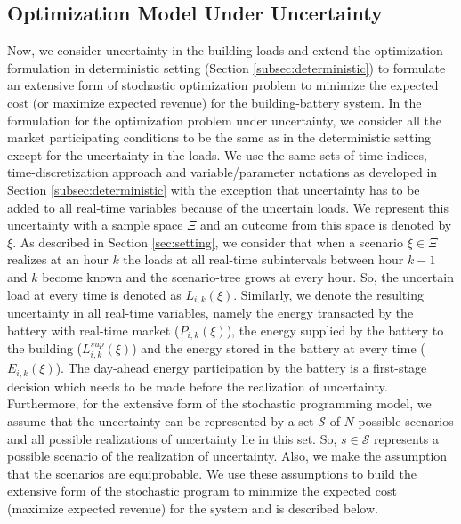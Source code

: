 \documentclass[11pt,twoside]{article}
\begin{document}
\subsection{Optimization Model Under Uncertainty} \label{subsec:opt_unc}
Now, we consider uncertainty in the building loads and extend the optimization formulation in deterministic setting (Section \ref{subsec:deterministic}) to formulate an extensive form of stochastic optimization problem to minimize the expected cost (or maximize expected revenue) for the building-battery system. In the formulation for the optimization problem under uncertainty, we consider all the market participating conditions to be the same as in the deterministic setting except for the uncertainty in the loads. We use the same sets of time indices, time-discretization approach and variable/parameter notations as developed in Section \ref{subsec:deterministic} with the exception that uncertainty has to be added to all real-time variables because of the uncertain loads. We represent this uncertainty with a sample space $\Xi$ and an outcome from this space is denoted by $\xi$. As described in Section \ref{sec:setting}, we consider that when a scenario $\xi \in \Xi$ realizes at an hour $k$ the loads at all real-time subintervals between hour $k-1$ and $k$ become known and the scenario-tree grows at every hour. So, the uncertain load at every time is denoted as $L_{i,k}(\xi)$. Similarly, we denote the resulting uncertainty in all real-time variables, namely the energy transacted by the battery with real-time market ($P_{i,k}(\xi)$), the energy supplied by the battery to the building ($L^{sup}_{i,k}(\xi)$) and the energy stored in the battery at every time ($E_{i,k}(\xi)$). The day-ahead energy participation by the battery is a first-stage decision which needs to be made before the realization of uncertainty. Furthermore, for the extensive form of the stochastic programming model, we assume that the uncertainty can be represented by a set $\mathcal{S}$ of $N$ possible scenarios and all possible realizations of uncertainty lie in this set. So, $s \in \mathcal{S}$ represents a possible scenario of the realization of uncertainty. Also, we make the assumption that the scenarios are equiprobable. We use these assumptions to build the extensive form of the stochastic program to minimize the expected cost (maximize expected revenue) for the system and is described below.
\end{document}
